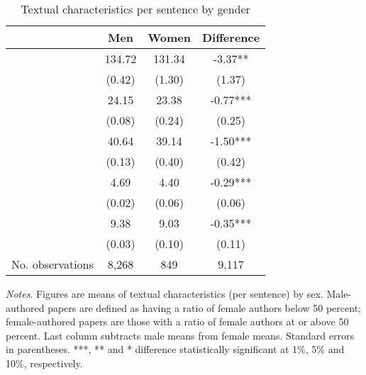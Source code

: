 \begin{table}
    \footnotesize
    \centering
    \begin{threeparttable}
        \caption{Textual characteristics per sentence by gender}
        \label{table2}
        \begin{tabular}{p{4cm}S@{}S@{}S@{}}
            \toprule
            &{Men}&{Women}&{Difference}\\
            \midrule
                &      134.72&      131.34&       -3.37** \\
                                          &      (0.42)&      (1.30)&      (1.37)   \\
                     &       24.15&       23.38&       -0.77***\\
                                          &      (0.08)&      (0.24)&      (0.25)   \\
                 &       40.64&       39.14&       -1.50***\\
                                          &      (0.13)&      (0.40)&      (0.42)   \\
            &        4.69&        4.40&       -0.29***\\
                                          &      (0.02)&      (0.06)&      (0.06)   \\
            &        9.38&        9.03&       -0.35***\\
                                          &      (0.03)&      (0.10)&      (0.11)   \\
            \midrule
            No. observations              &       8,268&         849&       9,117   \\
            \bottomrule
        \end{tabular}
        \begin{tablenotes}
            \tiny
            \item \textit{Notes}. Figures are means of textual characteristics (per sentence) by sex. Male-authored papers are defined as having a ratio of female authors below 50 percent; female-authored papers are those with a ratio of female authors at or above 50 percent. Last column subtracts male means from female means. Standard errors in parentheses. ***, ** and * difference statistically significant at 1\%, 5\% and 10\%, respectively.
        \end{tablenotes}
    \end{threeparttable}
\end{table}